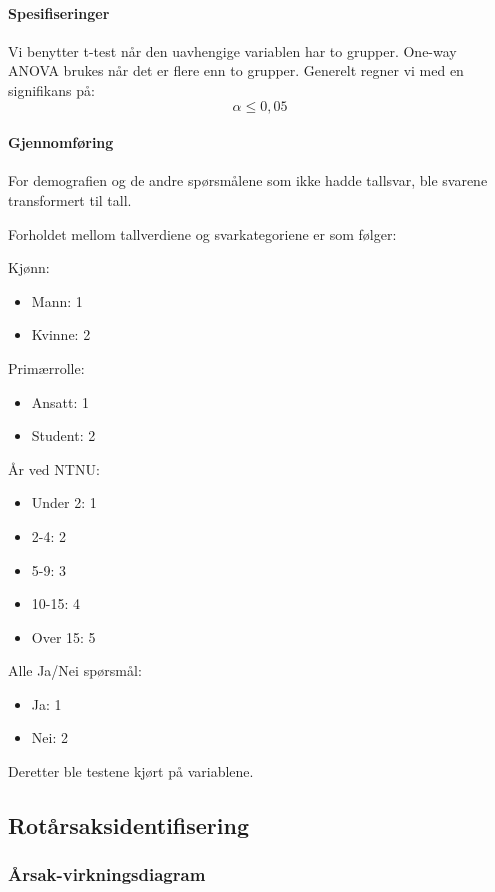 \paragraph{Spesifiseringer}
Vi benytter t-test når den uavhengige variablen har to grupper. One-way ANOVA brukes når det er flere enn to grupper. Generelt regner vi med en signifikans på: \[\alpha \le 0,05\]

\paragraph{Gjennomføring}
For demografien og de andre spørsmålene som ikke hadde tallsvar, ble svarene transformert til tall. 

Forholdet mellom tallverdiene og svarkategoriene er som følger:

Kjønn:
\begin{itemize}
    \item Mann: 1
    \item Kvinne: 2
\end{itemize}

Primærrolle:
\begin{itemize}
    \item Ansatt: 1
    \item Student: 2
\end{itemize}

År ved NTNU:
\begin{itemize}
    \item Under 2: 1
    \item 2-4: 2
    \item 5-9: 3
    \item 10-15: 4
    \item Over 15: 5
\end{itemize}

Alle Ja/Nei spørsmål:
\begin{itemize}
    \item Ja: 1
    \item Nei: 2
\end{itemize}

Deretter ble testene kjørt på variablene. 


\subsection{Rotårsaksidentifisering}

\subsubsection{Årsak-virkningsdiagram}

